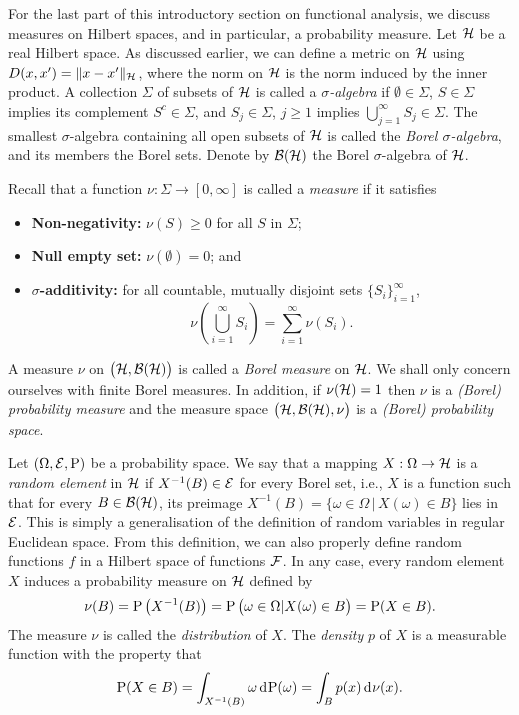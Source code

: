 For the last part of this introductory section on functional analysis, we discuss measures on Hilbert spaces, and in particular, a probability measure.
Let ${\mathcal H}$ be a real Hilbert space. 
As discussed earlier, we can define a metric on ${\mathcal H}$ using $D(x,x') = \lVert x-x'\rVert_{\mathcal H}$, where the norm on ${\mathcal H}$ is the norm induced by the inner product.
A collection $\Sigma$ of subsets of ${\mathcal H}$ is called a \emph{$\sigma$-algebra} if $\emptyset \in \Sigma$, $S \in \Sigma$ implies its complement $S^c \in \Sigma$, and $S_j\in\Sigma$, $j\geq 1$ implies $\bigcup_{j=1}^\infty S_j \in \Sigma$.
The smallest $\sigma$-algebra containing all open subsets of ${\mathcal H}$ is called the \emph{Borel $\sigma$-algebra}, and its members the Borel sets.
Denote by ${\mathcal B}({\mathcal H})$ the Borel $\sigma$-algebra of ${\mathcal H}$.

Recall that a function $\nu:\Sigma\to[0,\infty]$ is called a \emph{measure} if it satisfies
\begin{itemize}
  \item \textbf{Non-negativity:} $\nu(S) \geq 0$ for all $S$ in $\Sigma$;
  \item \textbf{Null empty set:} $\nu(\emptyset) = 0$; and
  \item \textbf{$\sigma$-additivity:} for all countable, mutually disjoint sets $\{S_i\}_{i=1}^\infty$,
  \[
    \nu\left(\bigcup_{i=1}^\infty S_i \right) = \sum_{i=1}^\infty \nu(S_i).
  \] 
\end{itemize}
A measure $\nu$ on $\big({\mathcal H},{\mathcal B}({\mathcal H})\big)$ is called a \emph{Borel measure} on ${\mathcal H}$.
We shall only concern ourselves with finite Borel measures. 
In addition, if $\nu({\mathcal H}) = 1$ then $\nu$ is a \emph{(Borel) probability measure} and the measure space $\big({\mathcal H},{\mathcal B}({\mathcal H}),\nu\big)$ is a \emph{(Borel) probability space}.

Let $(\Omega,{\mathcal E},\operatorname{P})$ be a probability space.
We say that a mapping $X:\Omega\to{\mathcal H}$ is a \emph{random element} in ${\mathcal H}$ if $X^{-1}(B)\in{\mathcal E}$ for every Borel set, i.e., $X$ is a function such that for every $B\in{\mathcal B}({\mathcal H})$, its preimage $X^{-1}(B) = \{\omega \in \Omega \,|\, X(\omega) \in B \}$ lies in ${\mathcal E}$.
This is simply a generalisation of the definition of random variables in regular Euclidean space.
From this definition, we can also properly define random functions $f$ in a Hilbert space of functions ${\mathcal F}$.
In any case, every random element $X$ induces a probability measure on ${\mathcal H}$ defined by
\[
  \nu(B) = \operatorname{P}\big(X^{-1}(B)\big) = \operatorname{P}\big( \omega \in \Omega | X(\omega) \in B  \big) = \operatorname{P}(X \in B).
\]
The measure $\nu$ is called the \emph{distribution} of $X$.
The \emph{density} $p$ of $X$ is a measurable function with the property that
\[
  \operatorname{P}(X \in B) = \int_{X^{-1}(B)} \omega \operatorname{d}\hspace{0.5pt}\!\operatorname{P}(\omega) = \int_B p(x) \operatorname{d}\hspace{0.5pt}\!\nu(x).
\]

